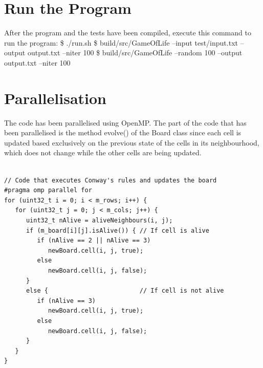 \documentclass[a4paper,12pt,twoside]{report}
\begin{document}
\section*{Run the Program}
After the program and the tests have been compiled, execute this command to run the program:
\newline
\$ ./run.sh \newline
\$ build/src/GameOfLife --input test/input.txt --output output.txt --niter 100\newline
\$ build/src/GameOfLife --random 100 --output output.txt --niter 100
\section*{Parallelisation}
The code has been parallelised using OpenMP. The part of the code that has been parallelised is the method evolve() of the Board class since each cell is updated  based exclusively on the previous state of the cells in its neighbourhood, which does not change while the other cells are being updated.
\begin{lstlisting}

// Code that executes Conway's rules and updates the board
#pragma omp parallel for
for (uint32_t i = 0; i < m_rows; i++) {
   for (uint32_t j = 0; j < m_cols; j++) {
      uint32_t nAlive = aliveNeighbours(i, j);
      if (m_board[i][j].isAlive()) { // If cell is alive
         if (nAlive == 2 || nAlive == 3)
            newBoard.cell(i, j, true);
         else
            newBoard.cell(i, j, false);
	  }
	  else {                         // If cell is not alive
         if (nAlive == 3)
            newBoard.cell(i, j, true);
         else
            newBoard.cell(i, j, false);
      }
   }
}
\end{lstlisting}
\end{document}
